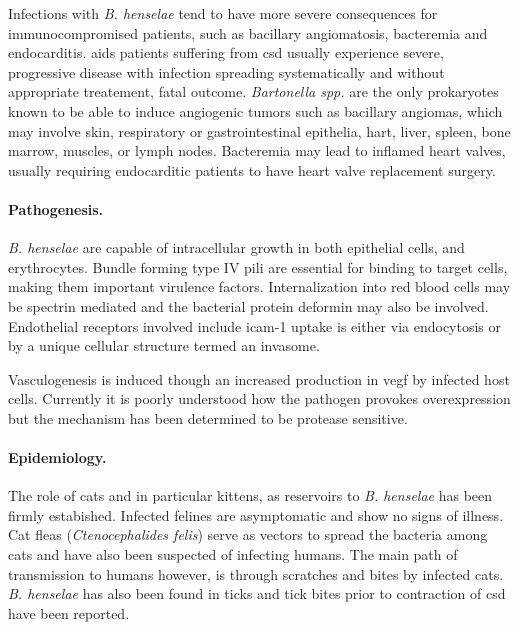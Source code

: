 
Infections with \textit{B. henselae} tend to have more severe consequences for immunocompromised patients, such as bacillary angiomatosis, bacteremia and endocarditis. \Gls{aids} patients suffering from \gls{csd} usually experience severe, progressive disease with infection spreading systematically and without appropriate treatement, fatal outcome. \textit{Bartonella spp.} are the only prokaryotes known to be able to induce angiogenic tumors such as bacillary angiomas, which may involve skin, respiratory or gastrointestinal epithelia, hart, liver, spleen, bone marrow, muscles, or lymph nodes. Bacteremia may lead to inflamed heart valves, usually requiring endocarditic patients to have heart valve replacement surgery.


\paragraph{Pathogenesis.}
\textit{B. henselae} are capable of intracellular growth in both epithelial cells, and erythrocytes. Bundle forming type IV pili are essential for binding to target cells, making them important virulence factors. Internalization into red blood cells may be spectrin mediated and the bacterial protein deformin may also be involved. Endothelial receptors involved include \gls{icam-1} uptake is either via endocytosis or by a unique cellular structure termed an invasome.

Vasculogenesis is induced though an increased production in \gls{vegf} by infected host cells. Currently it is poorly understood how the pathogen provokes overexpression but the mechanism has been determined to be protease sensitive.

\paragraph{Epidemiology.}
The role of cats and in particular kittens, as reservoirs to \textit{B. henselae} has been firmly estabished. Infected felines are asymptomatic and show no signs of illness. Cat fleas (\textit{Ctenocephalides felis}) serve as vectors to spread the bacteria among cats and have also been suspected of infecting humans. The main path of transmission to humans however, is through scratches and bites by infected cats. \textit{B. henselae} has also been found in ticks and tick bites prior to contraction of \gls{csd} have been reported.

